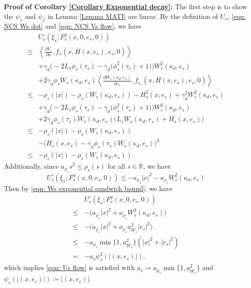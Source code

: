 \newpage
\textbf{Proof of Corollary \ref{Corollary Exponential decay}:} The first step is to show the $\psi_s$ and $\psi_f$ in Lemma \ref{Lemma MATI} are linear. By the definition of $U_s$, \eqref{eqn: NCS Ws dot} and \eqref{eqn: NCS Vs flow}, we have
\begin{equation*}
    \begin{aligned}
        & U_s^\circ(\xi_s; F_s^y(x,0,e_s, 0)) \\
        \leq &\left< \tfrac{\partial V_s}{\partial x}, f_x(x,\overline{H}(x,e_s),e_s,0)\right> \\
            & + \gamma_d \Big( -2 L_s \phi_s(\tau_s) - \gamma_d \big(\phi_s^2(\tau_s)+1\big) \Big) W_s^2(\kappa_d, e_s) \\
            &+ 2 \gamma_d\phi_s W_s(\kappa_d,e_s) \left< \tfrac{\partial {W_s}(\kappa_d,{e_s})}{\partial {e_s}}, f_{e_s}(x,\overline{H}(x,e_s),e_s, 0)\right> \\
        \leq & - \rho_s(|x|) - \rho_s\left(W_s(\kappa_d, e_s)\right) - H_s^2(x,e_s) + \gamma_d^2 W_s^2(\kappa_d, e_s) \\
            &+ \gamma_d \Big( -2 L_s \phi_s(\tau_s) - \gamma_d \big(\phi_s^2(\tau_s)+1\big) \Big) W_s^2(\kappa_d, e_s) \\
            &+ 2 \gamma_d \phi_s(\tau_s) W_s(\kappa_d, e_s)\big(L_s {W_s}(\kappa_d, e_s)  + H_s(x,e_s) \big)  \\
        \leq & - \rho_s(|x|) - \rho_s\left(W_s(\kappa_d, e_s)\right) \\
            &- \big(H_s(x,e_s) - \gamma_d \phi_s(\tau_s)W_s(\kappa_d, e_s)\big)^2 \\
        \leq & - \rho_s(|x|) - \rho_s\left(W_s(\kappa_d, e_s)\right).
    \end{aligned}
\end{equation*}
Additionally, since $a_{\rho_s} s^2 \leq \rho_s(s)$ for all $s \in \mathbb{R}$, we have
\begin{equation}
    U_s^\circ(\xi_s; F_s^y(x,0,e_s, 0)) \leq -a_{\rho_s} |x|^2 - a_{\rho_s} W_s^2(\kappa_d, e_s)
\end{equation}
Then by \eqref{eqn: Ws exponential sandwich bound}, we have
\begin{equation*}
    \begin{aligned}
        &U_s^\circ(\xi_s; F_s^y(x,0,e_s, 0)) \\
        \leq & - \big(a_{\rho_s} |x|^2 + a_{\rho_s} W_s^2(\kappa_d,e_s)\big) \\
        \leq & - \big(a_{\rho_s} |x|^2 + a_{\rho_s} \underline{a}_{W_s}^2 |e_s|^2\big) \\
        \leq & - a_{\rho_s} \min \{ 1, \underline{a}_{W_s}^2 \} (|x|^2+|e_s|^2) \\
        \eqqcolon & - a_s \psi_s^2(|(x,e_s)|),
    \end{aligned}
\end{equation*}
which implies \eqref{eqn: Us flow} is satisfied with $a_s \coloneqq a_{\rho_s} \min \{ 1, \underline{a}_{W_s}^2 \}$ and $\psi_s(|(x,e_s)|) \coloneqq |(x,e_s)|$. 

